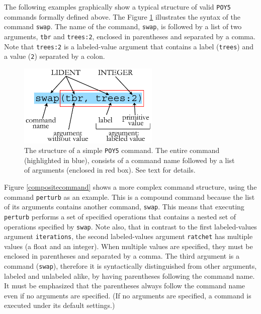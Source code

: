 \documentclass[11pt]{book}
\newcommand{\commandstyle}[1]{\texttt{#1}}
\newcommand{\poycommand}[1]{\commandstyle{#1}}
\newcommand{\poyargument}[1]{\commandstyle{#1}}
\newcommand{\poy}{\commandstyle{POY5}\xspace}
\begin{document}
The following examples graphically show a typical structure of valid \poy commands
formally defined above. The Figure \ref{simplecommand} illustrates
the syntax of the command \poycommand{swap}. The name of the
command, \poycommand{swap}, is followed by a list of two arguments,
\poyargument{tbr} and \poyargument{trees:2}, enclosed in parentheses
and separated by a comma. Note that \poyargument{trees:2} is a labeled-value
argument that contains a label (\texttt{trees}) and a value (\texttt{2})
separated by a colon.

\begin{figure}[htbp]
   \centering
   \includegraphics[width=0.60\textwidth]{doc/figures/fig-poycommand1.jpg}
   \caption{The structure of a simple \poy command. The entire command (highlighted
   in blue), consists of  a command name followed by a list of arguments (enclosed in red box).
   See text for details.}
   \label{simplecommand}
\end{figure}

Figure \ref{compositecommand} shows a more complex command structure, using the command \poycommand{perturb} as an example. This is a compound command because the list of its arguments contains another command, \poycommand{swap}. This means that executing \poycommand{perturb} performs a set of specified operations that contains a nested set of operations specified by \poycommand{swap}. Note also, that in contrast to the first labeled-values argument \poyargument{iterations}, the second labeled-values argument \poyargument{ratchet} has multiple values (a float and an integer). When multiple values are specified, they must be enclosed in parentheses and separated by a comma. The third argument is a command (\poycommand{swap}), therefore it is syntactically distinguished from other arguments, labeled and unlabeled alike, by having parentheses following the command name. It must be emphasized that the parentheses always follow the command name even if no arguments are specified. (If no arguments are specified, a command is executed under its default settings.)
\end{document}
